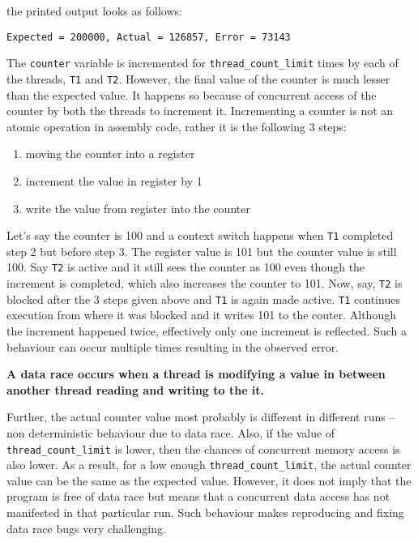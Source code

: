 \documentclass{scrartcl}
\begin{document}
the printed output looks as follows:
\begin{verbatim}
Expected = 200000, Actual = 126857, Error = 73143
\end{verbatim}

The \texttt{counter} variable is incremented for \texttt{thread_count_limit} times by each of the threads, \texttt{T1} and \texttt{T2}. However, the final value of the counter is much lesser than the expected value. It happens so because of concurrent access of the counter by both the threads to increment it. Incrementing a counter is not an atomic operation in assembly code, rather it is the following 3 steps:

\begin{enumerate}
	\item moving the counter into a register
	\item increment the value in register by 1
	\item write the value from register into the counter
\end{enumerate}

Let's say the counter is 100 and a context switch happens when \texttt{T1} completed step 2 but before step 3. The register value is 101 but the counter value is still 100. Say \texttt{T2} is active and it still sees the counter as 100 even though the increment is completed, which also increases the counter to 101. Now, say, \texttt{T2} is blocked after the 3 steps given above and \texttt{T1} is again made active. \texttt{T1} continues execution from where it was blocked and it writes 101 to the couter. Although the increment happened twice, effectively only one increment is reflected. Such a behaviour can occur multiple times resulting in the observed error.

\textbf{A data race occurs when a thread is modifying a value in between another thread reading and writing to the it.}

Further, the actual counter value most probably is different in different runs -- non deterministic behaviour due to data race. Also, if the value of \texttt{thread_count_limit} is lower, then the chances of concurrent memory access is also lower. As a result, for a low enough \texttt{thread_count_limit}, the actual counter value can be the same as the expected value. However, it does not imply that the program is free of data race but means that a concurrent data access has not manifested in that particular run. Such behaviour makes reproducing and fixing data race bugs very challenging.
\end{document}
